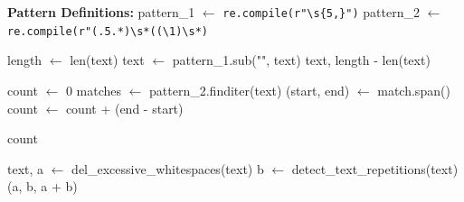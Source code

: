 \begin{algorithm}
\caption{Detect Repetitions}\label{alg:detect_repetitions}
\begin{algorithmic}[1]
\State \textbf{Pattern Definitions:}
\State pattern\_1 $\gets$ \texttt{re.compile(r"\textbackslash s\{5,\}")}
\State pattern\_2 $\gets$ \texttt{re.compile(r"(.{5}.*)\textbackslash s*((\textbackslash 1)\textbackslash s*)}

    \State length $\gets$ len(text)
    \State text $\gets$ pattern\_1.sub("", text)
    \State \Return text, length - len(text)
\EndFunction

    \State count $\gets$ 0
    \State matches $\gets$ pattern\_2.finditer(text)
        \State (start, end) $\gets$ match.span()
        \State count $\gets$ count + (end - start)
    \EndFor

    \State \Return count
\EndFunction

    \State text, a $\gets$ del\_excessive\_whitespaces(text)
    \State b $\gets$ detect\_text\_repetitions(text)
    \State \Return (a, b, a + b)
\EndFunction
\end{algorithmic}
\end{algorithm}